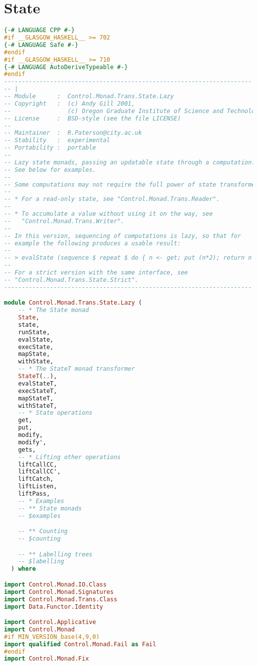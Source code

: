 \section{State}
\begin{lstlisting}[language=Haskell]
{-# LANGUAGE CPP #-}
#if __GLASGOW_HASKELL__ >= 702
{-# LANGUAGE Safe #-}
#endif
#if __GLASGOW_HASKELL__ >= 710
{-# LANGUAGE AutoDeriveTypeable #-}
#endif
----------------------------------------------------------------------
-- |
-- Module      :  Control.Monad.Trans.State.Lazy
-- Copyright   :  (c) Andy Gill 2001,
--                (c) Oregon Graduate Institute of Science and Technology, 2001
-- License     :  BSD-style (see the file LICENSE)
--
-- Maintainer  :  R.Paterson@city.ac.uk
-- Stability   :  experimental
-- Portability :  portable
--
-- Lazy state monads, passing an updatable state through a computation.
-- See below for examples.
--
-- Some computations may not require the full power of state transformers:
--
-- * For a read-only state, see "Control.Monad.Trans.Reader".
--
-- * To accumulate a value without using it on the way, see
--   "Control.Monad.Trans.Writer".
--
-- In this version, sequencing of computations is lazy, so that for
-- example the following produces a usable result:
--
-- > evalState (sequence $ repeat $ do { n <- get; put (n*2); return n }) 1
--
-- For a strict version with the same interface, see
-- "Control.Monad.Trans.State.Strict".
----------------------------------------------------------------------

module Control.Monad.Trans.State.Lazy (
    -- * The State monad
    State,
    state,
    runState,
    evalState,
    execState,
    mapState,
    withState,
    -- * The StateT monad transformer
    StateT(..),
    evalStateT,
    execStateT,
    mapStateT,
    withStateT,
    -- * State operations
    get,
    put,
    modify,
    modify',
    gets,
    -- * Lifting other operations
    liftCallCC,
    liftCallCC',
    liftCatch,
    liftListen,
    liftPass,
    -- * Examples
    -- ** State monads
    -- $examples

    -- ** Counting
    -- $counting

    -- ** Labelling trees
    -- $labelling
  ) where

import Control.Monad.IO.Class
import Control.Monad.Signatures
import Control.Monad.Trans.Class
import Data.Functor.Identity

import Control.Applicative
import Control.Monad
#if MIN_VERSION_base(4,9,0)
import qualified Control.Monad.Fail as Fail
#endif
import Control.Monad.Fix


\end{lstlisting}
